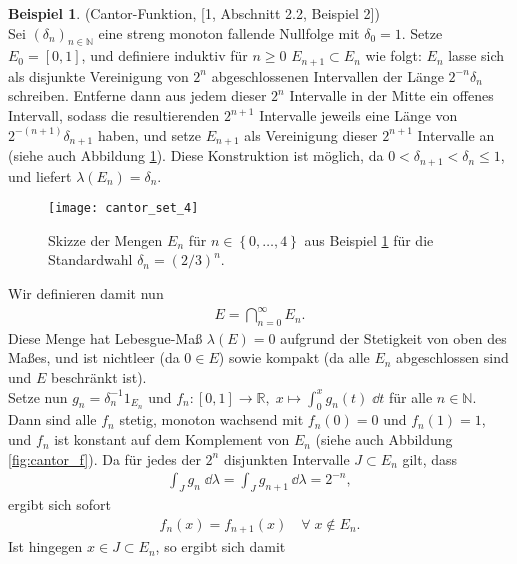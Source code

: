\documentclass[twoside]{article}
\theoremstyle{definition}
\newtheorem{example}[theorem]{Beispiel}
\newcommand{\R}{\mathbb{R}}
\newcommand{\N}{\mathbb{N}}
\newcommand{\lgk}{\left\{}
\newcommand{\rgk}{\right\}}
\begin{document}
\begin{example} (Cantor-Funktion, [1, Abschnitt 2.2, Beispiel 2]) \label{bsp:cantor}\\
Sei $(\delta_n)_{n \in \N}$ eine streng monoton fallende Nullfolge mit $\delta_0 = 1$. Setze $E_0 = [0,1]$, und definiere induktiv für $n \geq 0$ $E_{n+1} \subset E_n$ wie folgt: $E_n$ lasse sich als disjunkte Vereinigung von $2^n$ abgeschlossenen Intervallen der Länge $2^{-n} \delta_n$ schreiben. Entferne dann aus jedem dieser $2^n$ Intervalle in der Mitte ein offenes Intervall, sodass die resultierenden $2^{n+1}$ Intervalle jeweils eine Länge von $2^{-(n+1)} \delta_{n+1}$ haben, und setze $E_{n+1}$ als Vereinigung dieser $2^{n+1}$ Intervalle an (siehe auch Abbildung \ref{fig:cantor_set}). Diese Konstruktion ist möglich, da $0 < \delta_{n+1} < \delta_n \leq 1$, und liefert $\lambda(E_n) = \delta_n$.\\
\begin{figure}
\centering
\texttt{[image: cantor\_set\_4]}
\caption{Skizze der Mengen $E_n$ für $n \in \lgk 0, \dots, 4 \rgk$ aus Beispiel \ref{bsp:cantor} für die Standardwahl $\delta_n = (2 / 3)^n$.}
\label{fig:cantor_set}
\end{figure}
Wir definieren damit nun
\begin{align*}
E = \bigcap_{n=0}^\infty E_n.
\end{align*}
Diese Menge hat Lebesgue-Maß $\lambda(E) = 0$ aufgrund der Stetigkeit von oben des Maßes, und ist nichtleer (da $0 \in E$) sowie kompakt (da alle $E_n$ abgeschlossen sind und $E$ beschränkt ist).\\
Setze nun $g_n = \delta_n^{-1} 1_{E_n}$ und $f_n: [0,1] \to \R, \; x \mapsto \int_0^x g_n(t) \; \dd t$ für alle $n \in \N$. Dann sind alle $f_n$ stetig, monoton wachsend mit $f_n(0) = 0$ und $f_n(1) = 1$, und $f_n$ ist konstant auf dem Komplement von $E_n$ (siehe auch Abbildung \ref{fig:cantor_f}). Da für jedes der $2^n$ disjunkten Intervalle $J \subset E_n$ gilt, dass
\begin{align*}
\int_J g_n \; \dd \lambda = \int_J g_{n+1} \, \dd \lambda = 2^{-n},
\end{align*}
ergibt sich sofort
\begin{align*}
f_n(x) = f_{n+1}(x) \quad \forall \; x \not \in E_n.
\end{align*}
Ist hingegen $x \in J \subset E_n$, so ergibt sich damit

\end{example}
\end{document}
